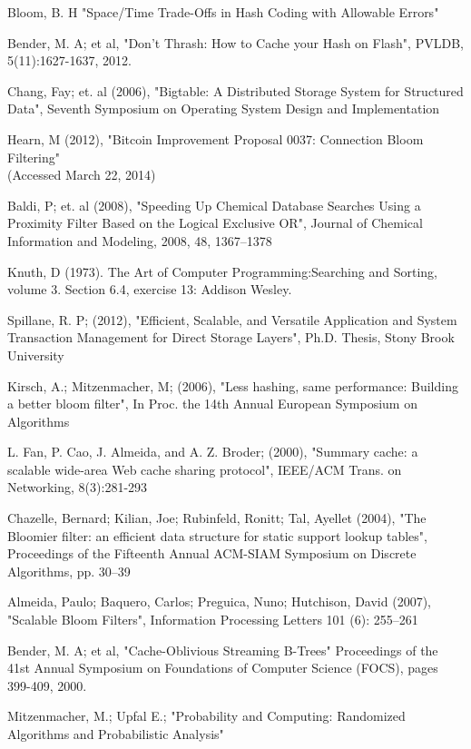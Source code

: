\documentclass[twoside]{article}
\begin{document}
\begin{thebibliography}{99} %

Bloom, B. H "Space/Time Trade-Offs in Hash Coding with Allowable Errors"

Bender, M. A; et al, "Don't Thrash: How to Cache your Hash on Flash",  PVLDB, 5(11):1627-1637, 2012. 

Chang, Fay; et. al (2006), "Bigtable: A Distributed Storage System for Structured Data", Seventh Symposium on Operating System Design and Implementation

Hearn, M (2012), "Bitcoin Improvement Proposal 0037: Connection Bloom Filtering" \\
 (Accessed March 22, 2014)

Baldi, P; et. al (2008), "Speeding Up Chemical Database Searches Using a Proximity Filter Based on the Logical Exclusive OR", Journal of Chemical Information and Modeling, 2008, 48, 1367--1378

Knuth, D (1973). The Art of Computer Programming:Searching and Sorting, volume 3. Section 6.4, exercise 13: Addison Wesley.

Spillane, R. P; (2012), "Efficient, Scalable, and Versatile Application and System Transaction Management for Direct Storage Layers", Ph.D. Thesis, Stony Brook University

Kirsch, A.; Mitzenmacher, M; (2006), "Less hashing, same performance: Building a better bloom filter", In Proc. the 14th Annual European Symposium on Algorithms

L. Fan, P. Cao, J. Almeida, and A. Z. Broder; (2000), "Summary cache: a scalable wide-area Web cache sharing protocol", IEEE/ACM Trans. on Networking, 8(3):281-293

Chazelle, Bernard; Kilian, Joe; Rubinfeld, Ronitt; Tal, Ayellet (2004), "The Bloomier filter: an efficient data structure for static support lookup tables", Proceedings of the Fifteenth Annual ACM-SIAM Symposium on Discrete Algorithms, pp. 30–39

Almeida, Paulo; Baquero, Carlos; Preguica, Nuno; Hutchison, David (2007), "Scalable Bloom Filters", Information Processing Letters 101 (6): 255–261

Bender, M. A; et al, "Cache-Oblivious Streaming B-Trees" Proceedings of the 41st Annual Symposium on Foundations of Computer Science (FOCS), pages 399-409, 2000.

Mitzenmacher, M.; Upfal E.; "Probability and Computing: Randomized Algorithms and Probabilistic Analysis"

\end{thebibliography}
\end{document}
